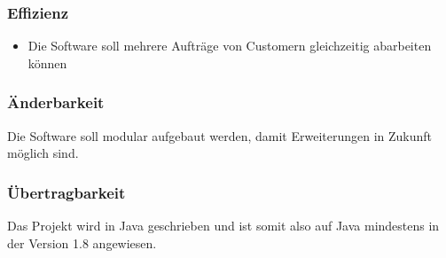 \subsubsection{Effizienz}
\begin{itemize}
  \item Die Software soll mehrere Aufträge von Customern gleichzeitig abarbeiten können
\end{itemize}
\subsubsection{Änderbarkeit}
Die Software soll modular aufgebaut werden, damit Erweiterungen in Zukunft möglich sind.
\subsubsection{Übertragbarkeit}
Das Projekt wird in Java geschrieben und ist somit also auf Java mindestens in der Version 
1.8 angewiesen.
